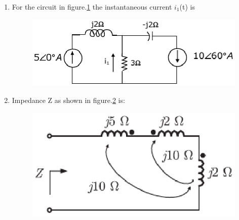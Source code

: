 \documentclass[journal,12pt,twocolumn]{IEEEtran}
\begin{document}
\begin{enumerate}
\item For the circuit in figure.\ref{fig59} the instantaneous current $i_{1}$(t) is
\begin{enumerate}
\setlength\itemsep{2em}
\begin{figure}[!h]
\begin{center}
\includegraphics[scale=0.7]{./figs/fig59.eps}
\caption{}
\label{fig59}
\end{center}
\end{figure}
\end{enumerate}

\item Impedance Z as shown in figure.\ref{fig60} is:
\begin{enumerate}
\setlength\itemsep{2em}
\begin{figure}[!h]
\begin{center}
\includegraphics[scale=0.5]{./figs/fig60.eps}
\caption{}
\label{fig60}
\end{center}
\end{figure}
\end{enumerate}


\end{enumerate}
\end{document}
